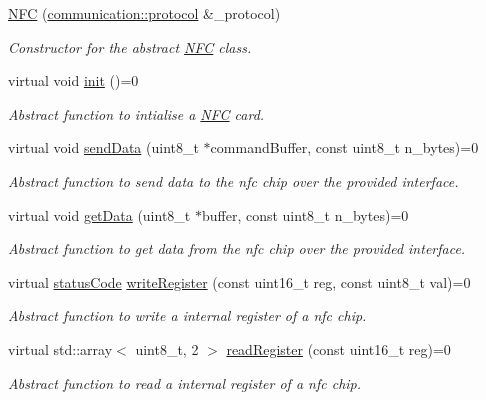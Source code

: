 \begin{DoxyCompactItemize}
\item 
\hyperlink{classnfc_1_1NFC_a6ebeb8952cb8be604ef33d4188f86303}{N\+FC} (\hyperlink{classcommunication_1_1protocol}{communication\+::protocol} \&\+\_\+protocol)
\begin{DoxyCompactList}\small\item\em Constructor for the abstract \hyperlink{classnfc_1_1NFC}{N\+FC} class. \end{DoxyCompactList}\item 
virtual void \hyperlink{classnfc_1_1NFC_a9893c1b762ed0c6796afcde7733bd8cc}{init} ()=0
\begin{DoxyCompactList}\small\item\em Abstract function to intialise a \hyperlink{classnfc_1_1NFC}{N\+FC} card. \end{DoxyCompactList}\item 
virtual void \hyperlink{classnfc_1_1NFC_af8fe01b21da65e4e8334f802073168ab}{send\+Data} (uint8\+\_\+t $\ast$command\+Buffer, const uint8\+\_\+t n\+\_\+bytes)=0
\begin{DoxyCompactList}\small\item\em Abstract function to send data to the nfc chip over the provided interface. \end{DoxyCompactList}\item 
virtual void \hyperlink{classnfc_1_1NFC_a3458fc807a5f0d485099a1e5f54bcbb5}{get\+Data} (uint8\+\_\+t $\ast$buffer, const uint8\+\_\+t n\+\_\+bytes)=0
\begin{DoxyCompactList}\small\item\em Abstract function to get data from the nfc chip over the provided interface. \end{DoxyCompactList}\item 
virtual \hyperlink{declarations_8h_ae1d20c5a38cae82ccaa6a77be3fd264b}{status\+Code} \hyperlink{classnfc_1_1NFC_a7e0a000aadae9b545e94ba213d4ac24e}{write\+Register} (const uint16\+\_\+t reg, const uint8\+\_\+t val)=0
\begin{DoxyCompactList}\small\item\em Abstract function to write a internal register of a nfc chip. \end{DoxyCompactList}\item 
virtual std\+::array$<$ uint8\+\_\+t, 2 $>$ \hyperlink{classnfc_1_1NFC_a47da8428b5ee9011cc3f5e9cc501ce22}{read\+Register} (const uint16\+\_\+t reg)=0
\begin{DoxyCompactList}\small\item\em Abstract function to read a internal register of a nfc chip. \end{DoxyCompactList}\item 

\end{DoxyCompactItemize}
